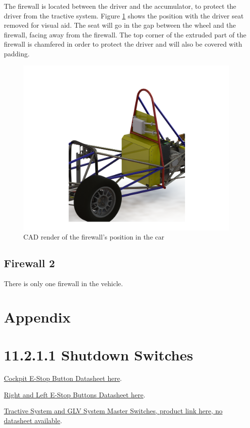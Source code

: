 \documentclass{article}
\begin{document}
            The firewall is located between the driver and the accumulator, to protect the driver from the tractive system. Figure \ref{firewallposition} shows the position with the driver seat removed for visual aid. The seat will go in the gap between the wheel and the firewall, facing away from the firewall. The top corner of the extruded part of the firewall is chamfered in order to protect the driver and will also be covered with padding.

            \begin{figure}[H]
                \centering
                \includegraphics[width = 0.6 \textwidth]{FirewallFullCarView}
                \caption{CAD render of the firewall's position in the car}
                \label{firewallposition}
            \end{figure}

    \subsection{Firewall 2}
        There is only one firewall in the vehicle.

\section{Appendix}
\section*{11.2.1.1 Shutdown Switches} \label{shutdownappendix}

\href{http://products.eao.com/index.php?IdTreeGroup=2344&IdProduct=48667&lang=en}{Cockpit E-Stop Button Datasheet here}.

\href{http://products.eao.com/index.php?IdTreeGroup=2344&IdProduct=48533&lang=en}{Right and Left E-Stop Buttons Datasheet here}.

\href{http://www.amazon.com/Volt-Battery-Disconnect-Kill-Switch/dp/B007O0BBFM}{Tractive System and GLV System Master Switches, product link here, no datasheet available}.
\end{document}
